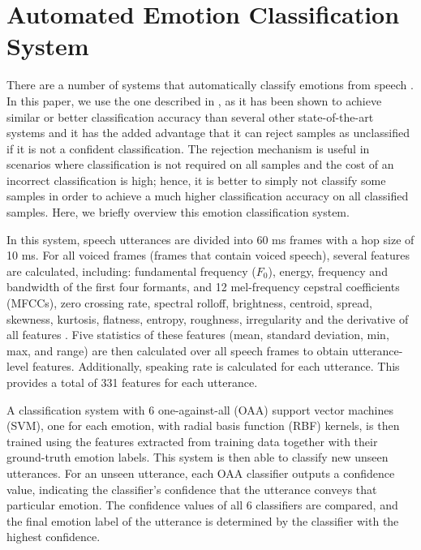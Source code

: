 \documentclass{article}
\begin{document}
\section{Automated Emotion Classification System} \label{EmoSystemSection}
There are a number of systems that automatically classify emotions from speech \cite{bitouk2010class,  rachuri2010emotionsense, schuller2003hidden, sethu2008empirical, yun2012loss}.
In this paper, we use the one described in \cite{yang2012speech}, as it has been shown to achieve similar or better classification accuracy than several other state-of-the-art systems \cite{bitouk2010class, rachuri2010emotionsense, sethu2008empirical} and it has the added advantage that it can reject samples as unclassified if it is not a confident classification. The rejection mechanism is useful in scenarios where classification is not required on all samples and the cost of an incorrect classification is high; hence, it is better to simply not classify some samples in order to achieve a much higher classification accuracy on all classified samples. Here, we briefly overview this emotion classification system. \par
In this system, speech utterances are divided into 60 ms frames with a hop size of 10 ms. For all voiced frames (frames that contain voiced speech), several features are calculated, including: fundamental frequency ($F_0$), energy, frequency and bandwidth of the first four formants, and 12 mel-frequency cepstral coefficients (MFCCs), zero crossing rate, spectral rolloff, brightness, centroid, spread, skewness, kurtosis, flatness, entropy, roughness, irregularity and the derivative of all features \cite{Signal2006Process}. Five statistics of these features (mean, standard deviation, min, max, and range) are then calculated over all speech frames to obtain utterance-level features. Additionally, speaking rate is calculated for each utterance. This provides a total of 331 features for each utterance. \par
A classification system with 6 one-against-all (OAA) support vector machines (SVM), one for each emotion, with radial basis function (RBF) kernels, is then trained using the features extracted from training data together with their ground-truth emotion labels. This system is then able to classify new unseen utterances.  For an unseen utterance, each OAA classifier outputs a confidence value, indicating the classifier's confidence that the utterance conveys that particular emotion. The confidence values of all 6 classifiers are compared, and the final emotion label of the utterance is determined by the classifier with the highest confidence. \par
\end{document}
